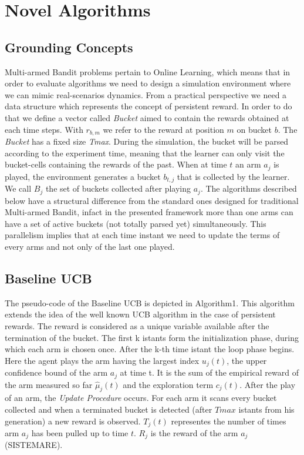 \chapter{Novel Algorithms}\label{C10}



\section{Grounding Concepts}
Multi-armed Bandit problems pertain to Online Learning, which means that in order to evaluate algorithms we need to design a simulation environment where we can mimic real-scenarios dynamics.
From a practical perspective we need a data structure which represents the concept of persistent reward. In order to do that we define a vector called \emph{Bucket} aimed to contain the rewards obtained at each time steps. With $r_{b,m}$ we refer to the reward at position $m$ on bucket $b$. The \emph{Bucket} has a fixed size \emph{Tmax}. During the simulation, the bucket will be parsed according to the experiment time, meaning that the learner can only visit the bucket-cells containing the rewards of the past. When at time $t$ an arm $a_j$ is played, the environment generates a bucket $b_{t,j}$ that is collected by the learner. We call $B_j$ the set of buckets collected after playing $a_j$.
The algorithms described below have a structural difference from the standard ones designed for traditional Multi-armed Bandit, infact in the presented framework more than one arms can have a set of active buckets (not totally parsed yet) simultaneously.  This parallelism implies that at each time instant we need to update the terms of every arms and not only of the last one played.


\section{Baseline UCB}
The pseudo-code of the Baseline UCB is depicted in Algorithm1. This algorithm extends the idea of the well known UCB algorithm in the case of persistent rewards. The reward is considered as a unique variable available after the termination of the bucket. The first k istants form the initialization phase, during which  each arm is chosen once. After the k-th time istant the loop phase begins. Here the agent plays the arm having the largest index $u_j(t)$, the upper confidence bound of the arm $a_j$ at time t. It is the sum of  the empirical reward of the arm measured so far $\hat{\mu}_j(t) $ and the exploration term $c_j(t) $. After the play of an arm, the \emph{Update Procedure} occurs. For each arm it scans every bucket collected and when a terminated bucket is detected (after $Tmax$ istants from his generation) a new reward is observed. $T_j(t)$ representes the number of times arm $a_j$ has been pulled up to time $t$. $R_j$ is the reward of the arm $a_j$ (SISTEMARE).




